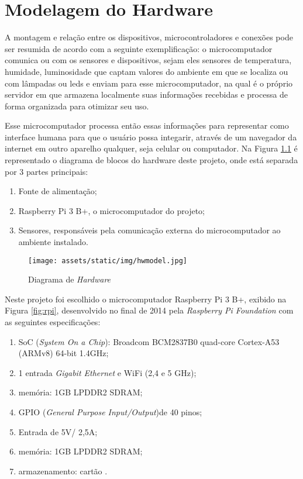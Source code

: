 \documentclass[../../layout.tex]{subfiles}
\begin{document}
\chapter{Modelagem do Hardware}
\hspace*{3em}A montagem e relação entre os dispositivos, microcontroladores e conexões pode ser resumida de acordo com a seguinte exemplificação: o microcomputador comunica ou com os sensores e dispositivos, sejam eles sensores de temperatura, humidade, luminosidade que captam valores do ambiente em que se localiza ou com lâmpadas ou leds e enviam para esse microcomputador, na qual é o próprio servidor em que armazena localmente suas informações recebidas e processa de forma organizada para otimizar seu uso. \par
\hspace*{3em}Esse microcomputador processa então essas informações para representar como interface humana para que o usuário possa integarir, através de um navegador da internet em outro aparelho qualquer, seja celular ou computador. Na Figura \ref{fig:hwmodel} é representado o diagrama de blocos do hardware deste projeto, onde está separada por 3 partes principais:

\begin{enumerate}[label=\alph*)]
\itemsep0em
    \item Fonte de alimentação; 
    \item Raspberry Pi 3 B+, o microcomputador do projeto;
    \item Sensores, responsáveis pela comunicação externa do microcomputador ao ambiente instalado.
\end{enumerate}
 
\begin{figure}[H]
\centering
\caption{Diagrama de \emph{Hardware}}
\texttt{[image: assets/static/img/hwmodel.jpg]}
\label{fig:hwmodel}

\begin{minipage}{0.5\textwidth}
\end{minipage}
\end{figure}

\hspace*{3em}Neste projeto foi escolhido o microcomputador Raspberry Pi 3 B+, exibido na Figura \ref{fig:rpi}, desenvolvido no final de 2014 pela \emph{Raspberry Pi Foundation} com as seguintes especificações:
\begin{enumerate}[label=\alph*)]
\itemsep0em
    \item SoC (\emph{System On a Chip}): Broadcom BCM2837B0 quad-core Cortex-A53 (ARMv8) 64-bit 1.4GHz;
    \item 1 entrada \emph{Gigabit Ethernet} e WiFi (2,4 e 5 GHz);
    \item memória: 1GB LPDDR2 SDRAM;
    \item GPIO (\emph{General Purpose Input/Output})de 40 pinos;
    \item Entrada de 5V/ 2,5A;
    \item memória: 1GB LPDDR2 SDRAM;
    \item armazenamento: cartão .
\end{enumerate}
\end{document}
